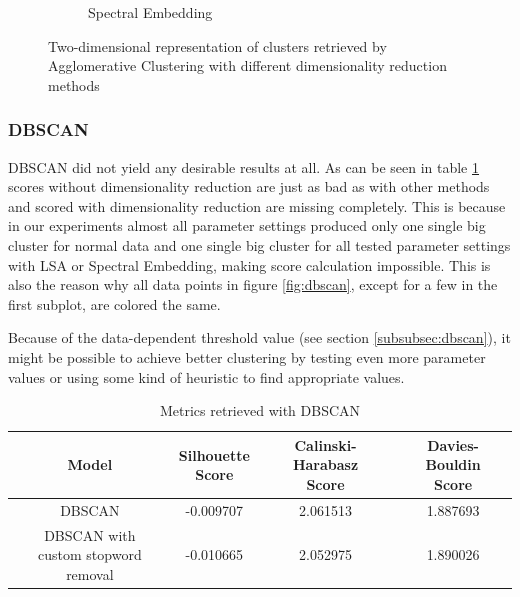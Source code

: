 \begin{figure}
\begin{subfigure}{.3\textwidth}
    \caption{Spectral Embedding}
    \label{fig:agglomerative_spectral}
  \end{subfigure}
  \caption{Two-dimensional representation of clusters retrieved by Agglomerative Clustering with different dimensionality reduction methods}
  \label{fig:agglomerative}
\end{figure}

\subsubsection{DBSCAN}

DBSCAN did not yield any desirable results at all. As can be seen in table \ref{tab:scores_dbscan} scores without dimensionality reduction are just as bad as with other methods and scored with dimensionality reduction are missing completely. This is because in our experiments almost all parameter settings produced only one single big cluster for normal data and one single big cluster for all tested parameter settings with LSA or Spectral Embedding, making score calculation impossible.
This is also the reason why all data points in figure \ref{fig:dbscan}, except for a few in the first subplot, are colored the same.

Because of the data-dependent threshold value (see section \ref{subsubsec:dbscan}), it might be possible to achieve better clustering by testing even more parameter values or using some kind of heuristic to find appropriate values.

\begin{table}[]
  \centering
  \begin{tabular}{c|c|c|c}
    Model &  \shortstack[c]{Silhouette \\ Score} & \shortstack[c]{Calinski-Harabasz \\ Score} &  \shortstack[c]{Davies-Bouldin \\ Score}  \\
    \hline
    \hline
    DBSCAN & -0.009707 & 2.061513 & 1.887693 \\
    \hline
    \shortstack[c]{DBSCAN with \\ custom stopword removal} & -0.010665 & 2.052975 & 1.890026 \\
   \end{tabular}
  \caption{Metrics retrieved with DBSCAN}
  \label{tab:scores_dbscan}
\end{table}

